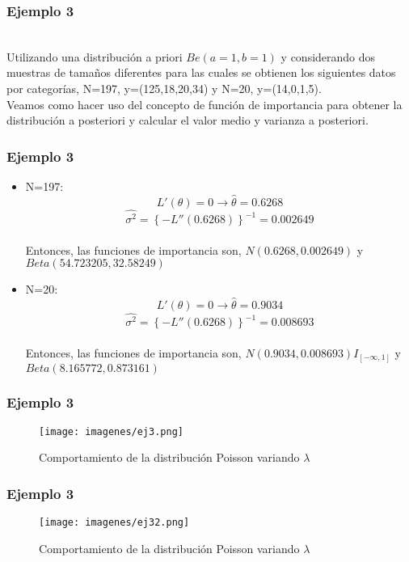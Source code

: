 \documentclass[12pt]{beamer}
\begin{document}
\begin{frame}
\frametitle{Ejemplo 3}
~\\Utilizando una distribución a priori $Be(a=1,b=1)$ y considerando dos muestras de tamaños diferentes para las cuales se obtienen los siguientes datos por categorías, N=197, y=(125,18,20,34) y N=20, y=(14,0,1,5).
~\\Veamos como hacer uso del concepto de función de importancia para obtener la distribución a posteriori y calcular el valor medio y varianza a posteriori.
\end{frame}

\begin{frame}
\frametitle{Ejemplo 3}
\begin{itemize}
\item N=197: $$L'(\theta)=0\rightarrow \hat{\theta}=0.6268$$
$$\hat{\sigma^2}=\left\lbrace -L''(0.6268) \right\rbrace ^{-1}=0.002649 $$
~\\Entonces, las funciones de importancia son, $N(0.6268,0.002649)$ y $Beta(54.723205,32.58249)$
\item N=20: $$L'(\theta)=0\rightarrow \hat{\theta}=0.9034$$
$$\hat{\sigma^2}=\left\lbrace -L''(0.6268) \right\rbrace ^{-1}=0.008693 $$
~\\Entonces, las funciones de importancia son, $N(0.9034,0.008693)I_{[-\infty,1]}$ y $Beta(8.165772,0.873161)$
\end{itemize}
\end{frame}

\begin{frame}
\frametitle{Ejemplo 3}
\begin{figure}[!h]
    \begin{center}
        \texttt{[image: imagenes/ej3.png]}
        \caption{Comportamiento de la distribución Poisson variando $\lambda$}
        \label{fig:Densidad}
    \end{center}
\end{figure}
\end{frame}

\begin{frame}
\frametitle{Ejemplo 3}
\begin{figure}[!h]
    \begin{center}
        \texttt{[image: imagenes/ej32.png]}
        \caption{Comportamiento de la distribución Poisson variando $\lambda$}
        \label{fig:Densidad}
    \end{center}
\end{figure}
\end{frame}
\end{document}
